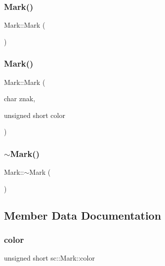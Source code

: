 \subsubsection{\texorpdfstring{Mark()}{Mark()}\hspace{0.1cm}{\footnotesize\ttfamily [1/2]}}
{\footnotesize\ttfamily Mark\+::\+Mark (\begin{DoxyParamCaption}{ }\end{DoxyParamCaption})}

\mbox{\label{classsc_1_1_mark_ab40174ee9848d0cbec1a3357e5431de0}} 
\subsubsection{\texorpdfstring{Mark()}{Mark()}\hspace{0.1cm}{\footnotesize\ttfamily [2/2]}}
{\footnotesize\ttfamily Mark\+::\+Mark (\begin{DoxyParamCaption}\item[{char}]{znak,  }\item[{unsigned short}]{color }\end{DoxyParamCaption})}

\mbox{\label{classsc_1_1_mark_a36a64089bd6fdca80b5356f59e62c1b3}} 
\subsubsection{\texorpdfstring{$\sim$Mark()}{~Mark()}}
{\footnotesize\ttfamily Mark\+::$\sim$\+Mark (\begin{DoxyParamCaption}{ }\end{DoxyParamCaption})}



\subsection{Member Data Documentation}
\mbox{\label{classsc_1_1_mark_a2351b074fb3a47fe1f33e917ac7734b2}} 
\subsubsection{\texorpdfstring{color}{color}}
{\footnotesize\ttfamily unsigned short sc\+::\+Mark\+::color}

